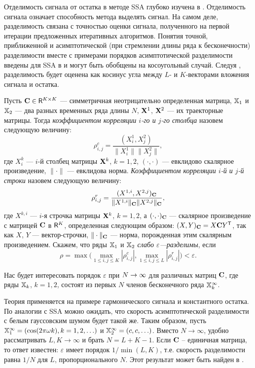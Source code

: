\documentclass[12pt, specialist, subf,href,colorlinks=true,substylefile = spbu.rtx]{disser}
\theoremstyle{remark}
\theoremstyle{definition}
\begin{document}
Отделимость сигнала от остатка в методе SSA глубоко изучена в \cite{Golyandina.etal2001,Golyandina2010}. Отделимость сигнала означает способность метода выделять сигнал. На самом деле, разделимость связана с точностью оценки сигнала, полученного на первой итерации предложенных итеративных алгоритмов. Понятия точной, приближенной и асимптотической (при стремлении длины ряда к бесконечности) разделимости вместе с примерами порядков асимптотической разделимости введены для SSA в \cite{Golyandina.etal2001} и могут быть обобщены на косоугольный случай. Следуя \cite{Golyandina.etal2001}, разделимость будет оценена как косинус угла между $L$- и $K$-векторами вложения сигнала и остатка.

Пусть $\mathbf{C} \in \mathsf{R}^{K \times K}$ --- симметричная неотрицательно определенная матрица, $\mathbb{X}_1$ и $\mathbb{X}_2$ ---  два разных временных ряда длины $N$, $\mathbf{X}^1$, $\mathbf{X}^2$ --- их траекторные матрицы. Тогда \emph{коэффициентом корреляции $i$-го и $j$-го столбца} назовем следующую величину:
\begin{equation}\label{col_corr}
\rho^c_{i,j} = \frac{(X^1_i, X^2_j)}{\|X^1_i\| \|X^2_j\|},
\end{equation}
где $X^k_i$ --- $i$-й столбец матрицы $\mathbf{X}^k$, $k = 1, 2$, $(\cdot, \cdot)$ --- евклидово скалярное произведение, $\|\cdot\|$ --- евклидова норма. \emph{Коэффициентом корреляции $i$-й и $j$-й строки} назовем следующую величину:
\begin{equation}\label{row_corr}
\rho^r_{i,j} = \frac{(X^{1,i}, X^{2,j})_{\mathbf{C}}}{\|X^{1,i}\|_{\mathbf{C}} \|X^{2,j}\|_{\mathbf{C}}},
\end{equation}
где $X^{k,i}$ --- $i$-я строчка матрицы $\mathbf{X}^k$, $k = 1, 2$, а $(\cdot, \cdot)_{\mathbf{C}}$ --- скалярное произведение с матрицей $\mathbf{C}$ в $\mathsf{R}^K$, определенная следующим образом: $(X, Y)_{\mathbf{C}} = X \mathbf{C} Y^{\mathsf{T}}$, так как $X$, $Y$ --- вектор-строчки, $\| \cdot \|_{\mathbf{C}}$ --- норма, порожденная этим скалярным произведением. Скажем, что ряды $\mathbb{X}_1$ и $\mathbb{X}_2$ \emph{слабо $\varepsilon$---разделимы}, если
\begin{equation}\label{weak_sep_eq}
\rho = \max\Big(\max_{1 \le i,j \le K}|\rho^c_{i,j}|, \max_{1 \le i,j \le L}|\rho^r_{i,j}|\Big) < \varepsilon.
\end{equation}

Нас будет интересовать порядок $\varepsilon$ при $N\rightarrow \infty$ для различных матриц $\mathbf{C}$, где ряды $\mathbb{X}_k$, $k=1,2$, состоят из первых $N$ членов бесконечного ряда $\mathbb{X}_k^\infty$.

Теория применяется на примере гармонического сигнала и константного остатка. По аналогии с SSA можно ожидать, что скорость асимптотической разделимости с белым гауссовским шумом будет такой же.
Таким образом, пусть
$\mathbb{X}_1^\infty = (\cos(2 \pi \omega k), k = 1, 2, \ldots)$ и  $\mathbb{X}_2^\infty = (c, c, \ldots)$. Вместо $N \to \infty$, удобно рассматривать $L,K \to \infty$ и брать $N = L + K - 1$. Если $\mathbf{C}$ -- единичная матрица, то ответ известен: $\varepsilon$ имеет порядок $1/\min(L,K)$, т.е. скорость разделимости равна $1/N$ для $L$, пропорционального $N$.
Этот результат может быть найден в \cite[Глава 6.1]{Golyandina.etal2001}.
\end{document}
